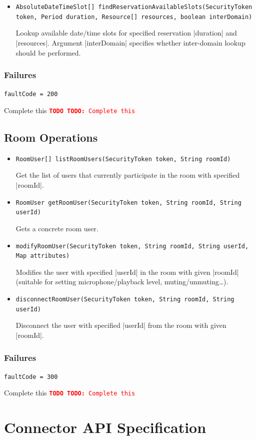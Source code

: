 \documentclass[a4paper]{report}
\newenvironment{Api}{\begin{itemize}}{\end{itemize}}
\newcommand{\ApiCode}[1]{\lstinline[style=styleApi]|#1|}
\newcommand{\ApiItem}[1]{\item #1 %

}
\newcommand{\ApiCmd}[1]{\ApiItem{\ApiCode{#1}}}
\newenvironment{ApiFailures}{\begin{compactitem}}{\end{compactitem}}
\newcommand{\ApiFailure}[1]{\ApiItem{\ApiCode{faultCode = #1}}}
\newcommand{\TODO}[1]{%
\def\empty{}%
\def\prvniparametr{#1}%
\ifx\prvniparametr\empty%
\begingroup\tt\textcolor{red}{\noindent\textbf{TODO}}\endgroup
\else%
\begingroup\tt\textcolor{red}{\noindent\textbf{TODO:}\ #1}\endgroup
\fi%
}
\begin{document}
\begin{Api}
\ApiCmd{AbsoluteDateTimeSlot[] findReservationAvailableSlots(SecurityToken token, Period duration, Resource[] resources, boolean interDomain)}
Lookup available date/time slots for specified reservation |duration| and |resources|. Argument |interDomain| specifies whether inter-domain lookup should be performed.

\end{Api}

\subsection{Failures}

\begin{ApiFailures}
\ApiFailure{200}
\end{ApiFailures}
\TODO{Complete this}


\section{Room Operations}

\begin{Api}

\ApiCmd{RoomUser[] listRoomUsers(SecurityToken token, String roomId)}
Get the list of users that currently participate in the room with specified |roomId|.

\ApiCmd{RoomUser getRoomUser(SecurityToken token, String roomId, String userId)}
Gets a concrete room user.

\ApiCmd{modifyRoomUser(SecurityToken token, String roomId, String userId, Map attributes)}
Modifies the user with specified |userId| in the room with given |roomId| (suitable for setting microphone/playback level, muting/unmuting\ldots).

\ApiCmd{disconnectRoomUser(SecurityToken token, String roomId, String userId)}
Disconnect the user with specified |userId| from the room with given |roomId|.

\end{Api}

\subsection{Failures}

\begin{ApiFailures}
\ApiFailure{300}
\end{ApiFailures}
\TODO{Complete this}


\chapter{Connector API Specification}
\end{document}

